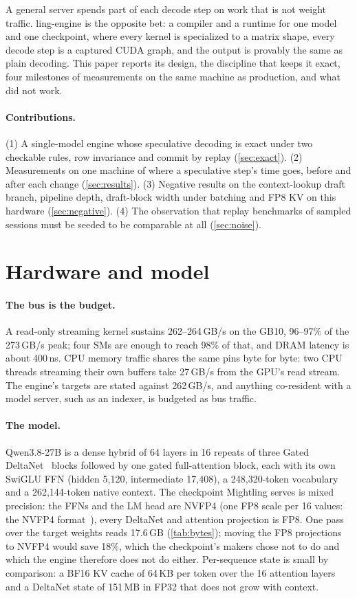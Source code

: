 \documentclass[11pt]{article}
\begin{document}
A general server spends part of each decode step on work that is not weight traffic. ling-engine is the opposite bet: a
compiler and a runtime for one model and one checkpoint, where every kernel is specialized to a matrix shape, every decode
step is a captured CUDA graph, and the output is provably the same as plain decoding. This paper reports its design, the
discipline that keeps it exact, four milestones of measurements on the same machine as production, and what did not work.

\paragraph{Contributions.}
(1) A single-model engine whose speculative decoding is exact under two checkable rules, row invariance and commit by
replay (\cref{sec:exact}).
(2) Measurements on one machine of where a speculative step's time goes, before and after each change
(\cref{sec:results}).
(3) Negative results on the context-lookup draft branch, pipeline depth, draft-block width under batching and FP8 KV on
this hardware (\cref{sec:negative}).
(4) The observation that replay benchmarks of sampled sessions must be seeded to be comparable at all
(\cref{sec:noise}).

\section{Hardware and model}

\paragraph{The bus is the budget.}
A read-only streaming kernel sustains 262--264\,GB/s on the GB10, 96--97\% of the 273\,GB/s peak; four SMs are enough
to reach 98\% of that, and DRAM latency is about 400\,ns. CPU memory traffic shares the same pins byte for byte: two CPU
threads streaming their own buffers take 27\,GB/s from the GPU's read stream. The engine's targets are stated against
262\,GB/s, and anything co-resident with a model server, such as an indexer, is budgeted as bus traffic.

\paragraph{The model.}
Qwen3.8-27B is a dense hybrid of 64 layers in 16 repeats of three Gated DeltaNet~\cite{yang2024deltanet,yang2025gateddeltanet} blocks followed by one gated
full-attention block, each with its own SwiGLU FFN (hidden 5,120, intermediate 17,408), a 248,320-token vocabulary and a
262,144-token native context. The checkpoint Mightling serves is mixed precision: the FFNs and the LM head are NVFP4
(one FP8 scale per 16 values: the NVFP4 format~\cite{nvfp4blog,ocpmx2023}), every DeltaNet and attention projection is FP8. One pass over the target weights reads
17.6\,GB (\cref{tab:bytes}); moving the FP8 projections to NVFP4 would save 18\%, which the checkpoint's makers chose
not to do and which the engine therefore does not do either. Per-sequence state is small by comparison: a BF16 KV cache
of 64\,KB per token over the 16 attention layers and a DeltaNet state of 151\,MB in FP32 that does not grow with context.
\end{document}
